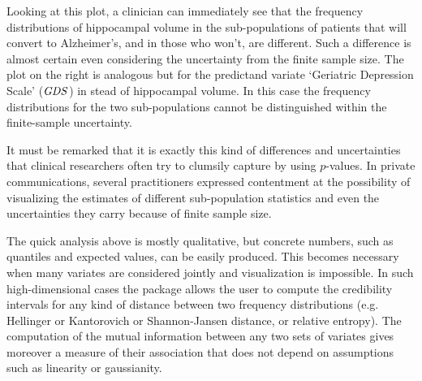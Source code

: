 Looking at this plot, a clinician can immediately see that the frequency distributions of hippocampal volume in the sub-populations of patients that will convert to Alzheimer's, and in those who won't, are different. Such a difference is almost certain even considering the uncertainty from the finite sample size. The plot on the right is analogous but for the predictand variate `Geriatric Depression Scale' ($\mathit{GDS}$) in stead of hippocampal volume. In this case the frequency distributions for the two sub-populations cannot be distinguished within the finite-sample uncertainty.

It must be remarked that it is exactly this kind of differences and uncertainties that clinical researchers often try to clumsily capture by using $p$-values. In private communications, several practitioners expressed contentment at the possibility of visualizing the estimates of different sub-population statistics and even the uncertainties they carry because of finite sample size.

The quick analysis above is mostly qualitative, but concrete numbers, such as quantiles and expected values, can be easily produced. This becomes necessary when many variates are considered jointly and visualization is impossible. In such high-dimensional cases the package allows the user to compute the credibility intervals for any kind of distance between two frequency distributions (e.g. Hellinger or Kantorovich or Shannon-Jansen distance, or relative entropy). The computation of the mutual information between any two sets of variates gives moreover a measure of their association that does not depend on assumptions such as linearity or gaussianity.

\medskip

